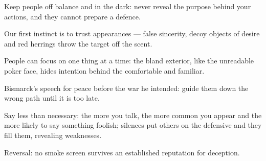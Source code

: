 

\begin{distilled}
  \item Keep people off balance and in the dark: never reveal the purpose behind your actions, and they cannot prepare a defence.
  \item Our first instinct is to trust appearances --- false sincerity, decoy objects of desire and red herrings throw the target off the scent.
  \item People can focus on one thing at a time: the bland exterior, like the unreadable poker face, hides intention behind the comfortable and familiar.
  \item Bismarck's speech for peace before the war he intended: guide them down the wrong path until it is too late.
  \item Say less than necessary: the more you talk, the more common you appear and the more likely to say something foolish; silences put others on the defensive and they fill them, revealing weaknesses.
  \item Reversal: no smoke screen survives an established reputation for deception.
\end{distilled}
